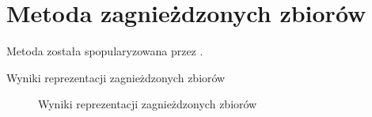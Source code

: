 \section{Metoda zagnieżdzonych zbiorów}

Metoda została spopularyzowana przez \cite{celko}.

\begin{table}[h!]
  \caption{Wyniki reprezentacji zagnieżdzonych zbiorów}
   \begin{center}
   \end{center}
\end{table}

\begin{figure}[h!t]
  \caption{Wyniki reprezentacji zagnieżdzonych zbiorów}
  \label{fig:img_chart_nested}
  \begin{center}
  \end{center}
\end{figure}

\clearpage